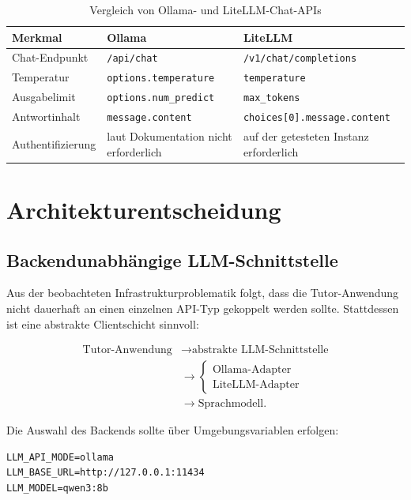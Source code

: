 \documentclass[11pt,a4paper,oneside,ngerman]{memoir}
\begin{document}
\begin{table}[htbp]
\centering
\caption{Vergleich von Ollama- und LiteLLM-Chat-APIs}
\label{tab:api-format-comparison}
\small
\begin{tabularx}{\textwidth}{@{}p{}p{}X@{}}
\toprule
\textbf{Merkmal} &
\textbf{Ollama} &
\textbf{LiteLLM} \\
\midrule
Chat-Endpunkt &
\texttt{/api/chat} &
\texttt{/v1/chat/completions} \\
\addlinespace
Temperatur &
\texttt{options.temperature} &
\texttt{temperature} \\
\addlinespace
Ausgabelimit &
\texttt{options.num\_predict} &
\texttt{max\_tokens} \\
\addlinespace
Antwortinhalt &
\texttt{message.content} &
\texttt{choices[0].message.content} \\
\addlinespace
Authentifizierung &
laut Dokumentation nicht erforderlich &
auf der getesteten Instanz erforderlich \\
\bottomrule
\end{tabularx}
\end{table}

\chapter{Architekturentscheidung}

\section{Backendunabhängige LLM-Schnittstelle}

Aus der beobachteten Infrastrukturproblematik folgt, dass die Tutor-Anwendung nicht dauerhaft an einen einzelnen API-Typ gekoppelt werden sollte. Stattdessen ist eine abstrakte Clientschicht sinnvoll:

\[
\begin{aligned}
\text{Tutor-Anwendung}
&\rightarrow \text{abstrakte LLM-Schnittstelle}\\
&\rightarrow
\begin{cases}
\text{Ollama-Adapter}\\
\text{LiteLLM-Adapter}
\end{cases}\\
&\rightarrow \text{Sprachmodell}.
\end{aligned}
\]

Die Auswahl des Backends sollte über Umgebungsvariablen erfolgen:

\begin{verbatim}
LLM_API_MODE=ollama
LLM_BASE_URL=http://127.0.0.1:11434
LLM_MODEL=qwen3:8b
\end{verbatim}
\end{document}
